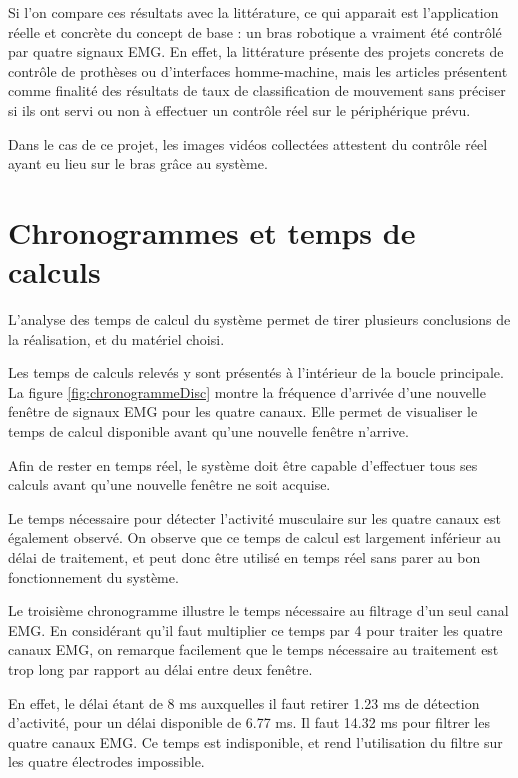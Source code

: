 \documentclass[letterpaper, twoside, 12pt, memoire, creativecommons, hyperref]{thETS}
\begin{document}
Si l'on compare ces résultats avec la littérature, ce qui apparait est l'application réelle et concrète du concept de base : un bras robotique a vraiment été contrôlé par quatre signaux EMG. En effet, la littérature présente des projets concrets de contrôle de prothèses ou d'interfaces homme-machine, mais les articles présentent comme finalité des résultats de taux de classification de mouvement sans préciser si ils ont servi ou non à effectuer un contrôle réel sur le périphérique prévu.

Dans le cas de ce projet, les images vidéos collectées attestent du contrôle réel ayant eu lieu sur le bras grâce au système.

\section{Chronogrammes et temps de calculs}

L'analyse des temps de calcul du système permet de tirer plusieurs conclusions de la réalisation, et du matériel choisi. 

Les temps de calculs relevés y sont présentés à l'intérieur de la boucle principale. La figure \ref{fig:chronogrammeDisc} montre la fréquence d'arrivée d'une nouvelle fenêtre de signaux EMG pour les quatre canaux. Elle permet de visualiser le temps de calcul disponible avant qu'une nouvelle fenêtre n'arrive. 

Afin de rester en temps réel, le système doit être capable d'effectuer tous ses calculs avant qu'une nouvelle fenêtre ne soit acquise. 

Le temps nécessaire pour détecter l'activité musculaire sur les quatre canaux est également observé. On observe que ce temps de calcul est largement inférieur au délai de traitement, et peut donc être utilisé en temps réel sans parer au bon fonctionnement du système.

Le troisième chronogramme illustre le temps nécessaire au filtrage d'un seul canal EMG. En considérant qu'il faut multiplier ce temps par 4 pour traiter les quatre canaux EMG, on remarque facilement que le temps nécessaire au traitement est trop long par rapport au délai entre deux fenêtre. 

En effet, le délai étant de 8 ms auxquelles il faut retirer 1.23 ms de détection d'activité, pour un délai disponible de 6.77 ms. Il faut 14.32 ms pour filtrer les quatre canaux EMG. Ce temps est indisponible, et rend l'utilisation du filtre sur les quatre électrodes impossible.
\end{document}

